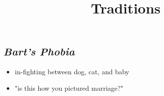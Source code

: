 \documentclass[11pt]{article}
\begin{document}
\title{Traditions}
\maketitle

\subsection{\textit{Bart's Phobia}}
\begin{itemize}
  \item in-fighting between dog, cat, and baby
  \item "is this how you pictured marriage?"
\end{itemize}
\end{document}
